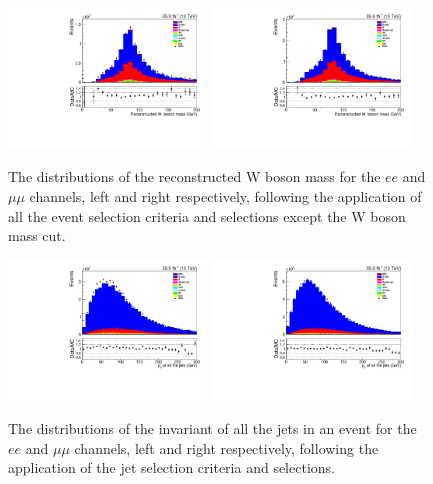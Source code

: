 \begin{figure}[tbp]
\centering
\includegraphics[width=0.47\textwidth]{figs/background-estimation/plots/unblinded/prompt_ee_ttbarInc/wPairMass_NPL_ee_bTag_ee.pdf}
\includegraphics[width=0.47\textwidth]{figs/background-estimation/plots/unblinded/prompt_mumu_ttbarInc/wPairMass_NPL_mumu_bTag_mumu.pdf}
\caption{
The distributions of the reconstructed W boson mass for the $ee$ and $\mu\mu$ channels, left and right respectively, following the application of all the event selection criteria and selections except the W boson mass cut.
}
\label{fig:SR_wBoson}
\end{figure}

\begin{figure}[tbp]
\centering
\includegraphics[width=0.47\textwidth]{figs/background-estimation/plots/unblinded/prompt_ee_ttbarInc/totalJetPt_NPL_ee_jetSel_ee.pdf}
\includegraphics[width=0.47\textwidth]{figs/background-estimation/plots/unblinded/prompt_mumu_ttbarInc/totalJetPt_NPL_mumu_jetSel_mumu.pdf}
\caption{
The distributions of the invariant \pT of all the jets in an event for the $ee$ and $\mu\mu$ channels, left and right respectively, following the application of the jet selection criteria and selections.
}
\label{fig:SR_totJetPt}
\end{figure}

